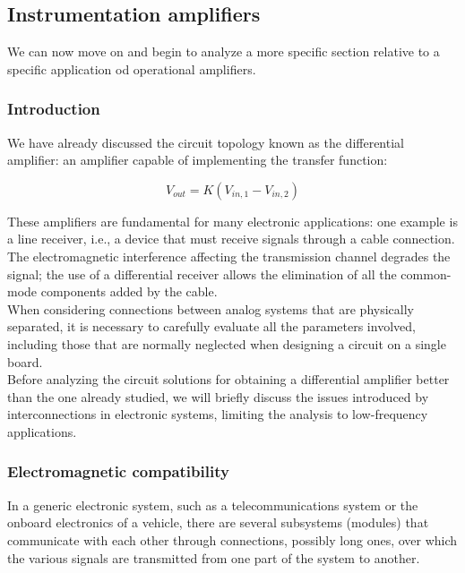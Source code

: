 \documentclass[../main.tex]{subfiles}
\begin{document}
\subsection{Instrumentation amplifiers}


We can now move on and begin to analyze a more specific section relative to a specific application od operational amplifiers.\\

\subsubsection{Introduction}


We have already discussed the circuit topology known as the differential amplifier: an amplifier capable of implementing the transfer function:


\begin{equation}
	V_{out} = K(V_{in,1} - V_{in,2})
\label{eq11}	
\end{equation}



These amplifiers are fundamental for many electronic applications:
one example is a line receiver, i.e., a device that must receive signals through a cable connection. The electromagnetic interference affecting the transmission channel degrades the signal; the use of a differential receiver allows the elimination of all the common-mode components added by the cable.\\

When considering connections between analog systems that are physically separated, it is necessary to carefully evaluate all the parameters involved, including those that are normally neglected when designing a circuit on a single board.\\ 

Before analyzing the circuit solutions for obtaining a differential amplifier better than the one already studied, we will briefly discuss the issues introduced by interconnections in electronic systems, limiting the analysis to low-frequency applications.


\subsubsection{Electromagnetic compatibility}


In a generic electronic system, such as a telecommunications system or the onboard electronics of a vehicle, there are several subsystems (modules) that communicate with each other through connections, possibly long ones, over which the various signals are transmitted from one part of the system to another.\\
\end{document}
